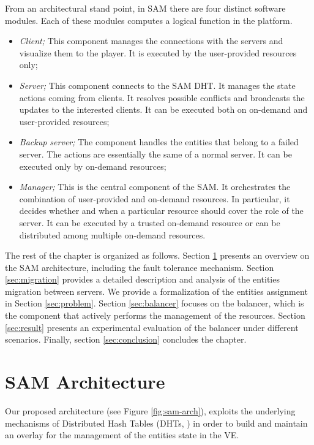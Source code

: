 \documentclass[final,10pt,a5paper]{phdimt}
\theoremstyle{definition}
\begin{document}
From an architectural stand point, in SAM there are four distinct software modules. Each of these modules computes a logical function in the platform.
\begin{itemize}
\item \textit{Client;} This component manages the connections with the servers and visualize them to the player. It is executed by the user-provided resources only;
\item \textit{Server;} This component connects to the SAM DHT. It manages the state actions coming from clients. It resolves possible conflicts and broadcasts the updates to the interested clients. It can be executed both on on-demand and user-provided resources;
\item \textit{Backup server;} The component handles the entities that belong to a failed server. The actions are essentially the same of a normal server. It can be executed only by on-demand resources;
\item \textit{Manager;} This is the central component of the SAM. It orchestrates the combination of user-provided and on-demand resources. In particular, it decides whether and when a particular resource should cover the role of the server. It can be executed by a trusted on-demand resource or can be distributed among multiple on-demand resources.
\end{itemize}


The rest of the chapter is organized as follows.
Section \ref{sec:sam-architecture} presents an overview on the SAM architecture, including the fault tolerance mechanism. 
Section \ref{sec:migration} provides a detailed description and analysis of the entities migration between servers.
We provide a formalization of the entities assignment in Section \ref{sec:problem}.
Section \ref{sec:balancer} focuses on the balancer, which is the component that actively performs the management of the resources.
Section \ref{sec:result} presents an experimental evaluation of the balancer under different scenarios.
Finally, section \ref{sec:conclusion} concludes the chapter.



\section{SAM Architecture}
\label{sec:sam-architecture}

Our proposed architecture (see Figure \ref{fig:sam-arch}), exploits the underlying mechanisms of Distributed Hash Tables (DHTs, \cite{Stoica2003, Steinmetz}) in order to build and maintain an overlay for the management of the entities state in the VE.
\end{document}
